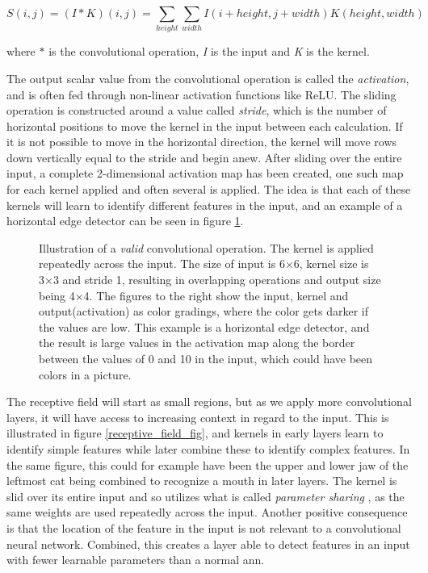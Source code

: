         \begin{equation}
            S(i,j) = (I*K)(i,j) = \sum_{height}\sum_{width}I(i+height,j+width)K(height,width)
        \end{equation}
     
     where $*$ is the convolutional operation, \textit{I} is the input and \textit{K} is the kernel.
     
     The output scalar value from the convolutional operation is called the \textit{activation}, and is often fed through non-linear activation functions like ReLU\cite{o2015introduction_convolutions}. The sliding operation is constructed around a value called \textit{stride}, which is the number of horizontal positions to move the kernel in the input between each calculation. If it is not possible to move in the horizontal direction, the kernel will move rows down vertically equal to the stride and begin anew. After sliding over the entire input, a complete 2-dimensional activation map has been created, one such map for each kernel applied and often several is applied. The idea is that each of these kernels will learn to identify different features in the input, and an example of a horizontal edge detector can be seen in figure \ref{convolutional_fig}. 
    \begin{figure}[H]
        \centering
                
        \caption[Horizontal edge detector example]{Illustration of a \textit{valid} convolutional operation. The kernel is applied repeatedly across the input. The size of input is 6×6, kernel size is 3×3 and stride 1, resulting in overlapping operations and output size being 4×4. The figures to the right show the input, kernel and output(activation) as color gradings, where the color gets darker if the values are low. This example is a horizontal edge detector, and the result is large values in the activation map along the border between the values of 0 and 10 in the input, which could have been colors in a picture.}
      	\medskip 
        \label{convolutional_fig}
    \end{figure}
    
    The receptive field will start as small regions, but as we apply more convolutional layers, it will have access to increasing context in regard to the input\cite{o2015introduction_convolutions}. This is illustrated in figure \ref{receptive_field_fig}, and kernels in early layers learn to identify simple features while later combine these to identify complex features. In the same figure, this could for example have been the upper and lower jaw of the leftmost cat being combined to recognize a mouth in later layers. The kernel is slid over its entire input and so utilizes what is called \textit{parameter sharing }, as the same weights are used repeatedly across the input. Another positive consequence is that the location of the feature in the input is not relevant to a convolutional neural network. Combined, this creates a layer able to detect features in an input with fewer learnable parameters than a normal \gls{ann}. 
    
